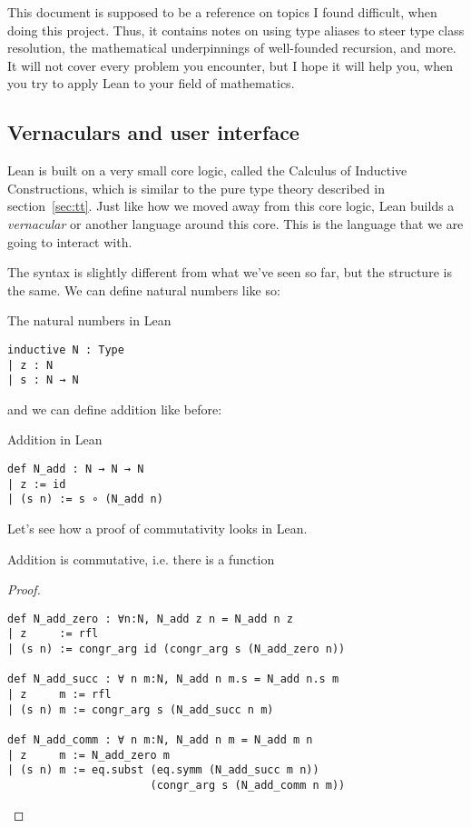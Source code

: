 \documentclass[a4paper, 12pt]{article}
\theoremstyle{changedot}
\theoremstyle{changedotbreak}
\theoremstyle{nonumberplain}
\newtheorem{proof}{Proof}
\begin{document}
This document is supposed to be a reference on topics I found difficult, when doing this project. Thus, it contains notes on using type aliases to steer type class resolution, the mathematical underpinnings of well-founded recursion, and more. It will not cover every problem you encounter, but I hope it will help you, when you try to apply Lean to your field of mathematics.

\subsection{Vernaculars and user interface}
Lean is built on a very small core logic, called the Calculus of Inductive Constructions, which is similar to the pure type theory described in section~\ref{sec:tt}. Just like how we moved away from this core logic, Lean builds a \textit{vernacular} or another language around this core. This is the language that we are going to interact with.

The syntax is slightly different from what we've seen so far, but the structure is the same. We can define natural numbers like so:

\begin{definition}
  The natural numbers in Lean
\begin{verbatim}
inductive N : Type
| z : N
| s : N → N
\end{verbatim}
\end{definition}

and we can define addition like before:

\begin{definition}
  Addition in Lean
\begin{verbatim}
def N_add : N → N → N
| z := id
| (s n) := s ∘ (N_add n)
\end{verbatim}
\end{definition}

Let's see how a proof of commutativity looks in Lean.

\begin{theorem}
  Addition is commutative, i.e. there is a function 
\end{theorem}
\begin{proof}~
  
  \begin{verbatim}
def N_add_zero : ∀n:N, N_add z n = N_add n z
| z     := rfl
| (s n) := congr_arg id (congr_arg s (N_add_zero n))

def N_add_succ : ∀ n m:N, N_add n m.s = N_add n.s m
| z     m := rfl
| (s n) m := congr_arg s (N_add_succ n m)

def N_add_comm : ∀ n m:N, N_add n m = N_add m n
| z     m := N_add_zero m
| (s n) m := eq.subst (eq.symm (N_add_succ m n))
                      (congr_arg s (N_add_comm n m))
\end{verbatim}
\end{proof}
\end{document}
